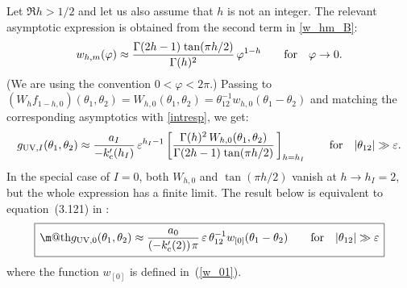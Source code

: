 \documentclass[12pt]{article}
\makeatletter
\newcommand*{\wideboxed}[1]{\setlength{\fboxsep}{1ex}%
  \fbox{\m@th$\displaystyle#1$}}
\newcommand{\cc}{\mathrm{c}}
\newcommand{\UV}{\text{UV}}
\newcommand{\vep}{\varepsilon}
\newcommand{\vp}{\varphi}
\def\ie{i.e.\ }
\makeatother
\begin{document}
Let $\Re h>1/2$ and let us also assume that $h$ is not an integer. The relevant asymptotic expression is obtained from the second term in \eqref{w_hm_B}:
\begin{equation}
w_{h,m}(\vp)
\approx \frac{\Gamma(2h-1)\kern1pt\tan(\pi h/2)}{\Gamma(h)^2}\,\vp^{1-h}\qquad
\text{for}\quad \vp\to 0.
\end{equation}
(We are using the convention $0<\vp<2\pi$.) Passing to $(W_{h}f_{1-h,0})(\theta_1,\theta_2) =W_{h,0}(\theta_1,\theta_2) =\theta_{12}^{-1}w_{h,0}(\theta_1-\theta_2)$ and matching the corresponding asymptotics with \eqref{intresp}, we get:
\begin{equation}
g_{\UV,I}(\theta_1,\theta_2)
\approx \frac{a_I}{-k'_{\cc}(h_I)}\,\vep^{h_{I}-1}
\left[\frac{\Gamma(h)^2\,W_{h,0}(\theta_1,\theta_2)}
{\Gamma(2h-1)\kern1pt \tan(\pi h/2)}\,\right]_{h=h_I}\qquad
\text{for}\quad |\theta_{12}|\gg\vep.
\end{equation}
In the special case of $I=0$, both $W_{h,0}$ and $\tan(\pi h/2)$ vanish at $h\to h_I=2$, but the whole expression has a finite limit. The result below is equivalent to equation~(3.121) in \cite{MS16}:
\begin{equation} \label{gUV0_const_vep}
\wideboxed{
g_{\UV,0}(\theta_1,\theta_2)
\approx \frac{a_0}{(-k'_{\cc}(2))\kern1pt\pi}\,\vep\,
\theta_{12}^{-1}w_{[0]}(\theta_1-\theta_2)\qquad
\text{for}\quad |\theta_{12}|\gg\vep
}
\end{equation}
where the function $w_{[0]}$ is defined in~(\ref{w_01}).
\end{document}

